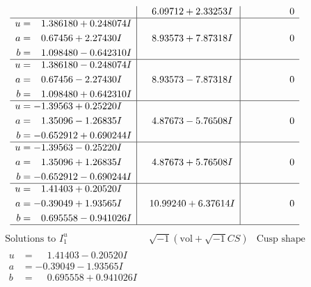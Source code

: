 \documentclass[1p]{elsarticle_modified}
\theoremstyle{definition}
\newcommand{\I}{\sqrt{-1}}
\begin{document}
$$\begin{array}{c|c|c}
 & \phantom{-}6.09712 + 2.33253 I & \phantom{-0.000000 } 0 \\ \hline\begin{aligned}
u &= \phantom{-}1.386180 + 0.248074 I \\
a &= \phantom{-}0.67456 + 2.27430 I \\
b &= \phantom{-}1.098480 - 0.642310 I\end{aligned}
 & \phantom{-}8.93573 + 7.87318 I & \phantom{-0.000000 } 0 \\ \hline\begin{aligned}
u &= \phantom{-}1.386180 - 0.248074 I \\
a &= \phantom{-}0.67456 - 2.27430 I \\
b &= \phantom{-}1.098480 + 0.642310 I\end{aligned}
 & \phantom{-}8.93573 - 7.87318 I & \phantom{-0.000000 } 0 \\ \hline\begin{aligned}
u &= -1.39563 + 0.25220 I \\
a &= \phantom{-}1.35096 - 1.26835 I \\
b &= -0.652912 + 0.690244 I\end{aligned}
 & \phantom{-}4.87673 - 5.76508 I & \phantom{-0.000000 } 0 \\ \hline\begin{aligned}
u &= -1.39563 - 0.25220 I \\
a &= \phantom{-}1.35096 + 1.26835 I \\
b &= -0.652912 - 0.690244 I\end{aligned}
 & \phantom{-}4.87673 + 5.76508 I & \phantom{-0.000000 } 0 \\ \hline\begin{aligned}
u &= \phantom{-}1.41403 + 0.20520 I \\
a &= -0.39049 + 1.93565 I \\
b &= \phantom{-}0.695558 - 0.941026 I\end{aligned}
 & \phantom{-}10.99240 + 6.37614 I & \phantom{-0.000000 } 0\\
 \hline 
 \end{array}$$\newpage$$\begin{array}{c|c|c}  
\text{Solutions to }I^u_{1}& \I (\text{vol} + \sqrt{-1}CS) & \text{Cusp shape}\\
 \hline 
\begin{aligned}
u &= \phantom{-}1.41403 - 0.20520 I \\
a &= -0.39049 - 1.93565 I \\
b &= \phantom{-}0.695558 + 0.941026 I\end{aligned}

\end{array}$$
\end{document}
